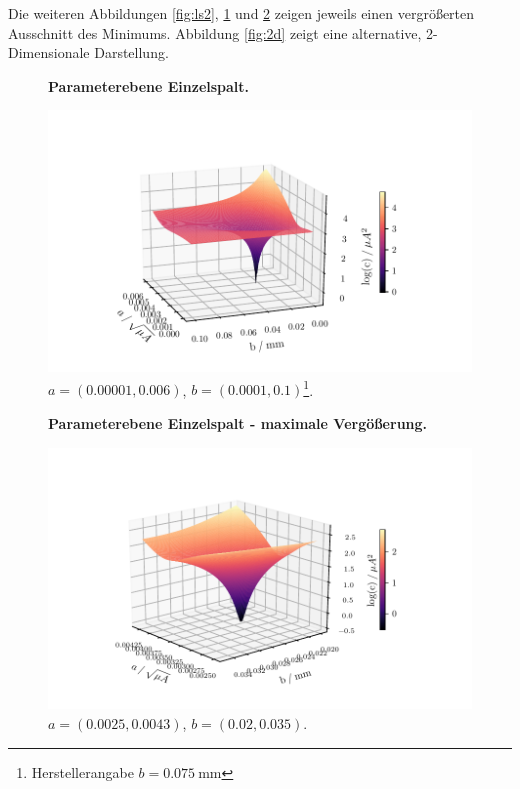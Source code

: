 Die weiteren Abbildungen \ref{fig:ls2}, \ref{fig:ls3} und \ref{fig:ls4} zeigen jeweils einen vergrößerten Ausschnitt des Minimums.
Abbildung \ref{fig:2d} zeigt eine alternative, 2-Dimensionale Darstellung.

\begin{figure}
    \centering
    \textbf{Parameterebene Einzelspalt.}\par\medskip
    \includegraphics[width=.9\textwidth]{python/leastSquares3.pdf}
    \caption{$a = (0.00001, 0.006)$, $b = (0.0001, 0.1)$\footnote{Herstellerangabe $b=\SI{0.075}{\milli\meter}$}.}
    \label{fig:ls3}
\end{figure}

\begin{figure}
    \centering
    \textbf{Parameterebene Einzelspalt - maximale Vergößerung.}\par\medskip
    \includegraphics[width=.9\textwidth]{python/leastSquares5.pdf}
    \caption{$a = (0.0025, 0.0043)$, $b = (0.02, 0.035)$.}
    \label{fig:ls4}
\end{figure}


